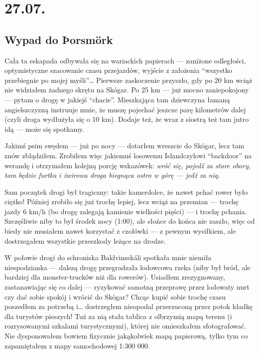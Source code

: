 \chapter*{27.07.}

\section*{Wypad do Þorsmörk}


Cała ta eskapada odbywała się na wariackich papierach --- zaniżone odległości, optymistyczne szacowanie czasu przejazdów, wyjście z założenia “wszystko przebiegnie po mojej myśli”… Pierwsze zaskoczenie przyszło, gdy po 20 km wciąż nie widziałem żadnego skrętu na Skógar. Po 25 km --- już mocno zaniepokojony --- pytam o drogę w jakiejś “chacie”. Mieszkająca tam dziewczyna łamaną angielszczyzną instruuje mnie, że muszę pojechać jeszcze parę kilometrów dalej (czyli droga wydłużyła się o 10 km). Dodaje też, że wraz z siostrą też tam jutro idą --- może się spotkamy.

Jakimś psim swędem --- już po nocy --- dotarłem wreszcie do Skógar, lecz tam znów zbłądziłem. Zrobiłem więc jakiemuś losowemu Islandczylowi “backdoor” na werandę i otrzymałem kolejną porcję wskazówek: \emph{wróć się, pojedź za stare obory, tam będzie furtka i żwirowa droga biegnąca ostro w górę --- jedź za nią}.

Sam początek drogi był tragiczny: takie kamerdolce, że nawet pchać rower było ciężko! Później zrobiło się już trochę lepiej, lecz wciąż na przemian --- trochę jazdy 6 km/h (bo drogę zalegają kamienie wielkości pięści) --- i trochę pchania. Szczęśliwie niby to był środek nocy (1:00), ale słońce do końca nie zaszło, więc od biedy nie musiałem nawet korzystać z czołówki --- z pewnym wysiłkiem, ale dostrzegałem wszystkie przeszkody leżące na drodze.

W połowie drogi do schroniska Baldvinsskáli spotkała mnie niemiła niespodzianka --- dalszą drogę przegradzała lodowcowa rzeka (niby był bród, ale bardziej dla monster-trucków niż dla rowerów). Usiadłem zrezygnowany, zastanawiając się co dalej --- ryzykować samotną przeprawę przez lodowaty nurt czy dać sobie spokój i wrócić do Skógar? Chcąc kupić sobie trochę czasu poszedłem za potrzebą i… dostrzegłem nieopodal przerzuconą przez potok kładkę dla turystów pieszych! Tuż za nią stała tablica z olbrzymią mapą terenu (i rozrysowanymi szkalami turystycznymi), której nie omieszkałem sfotografować. Nie dysponowałem bowiem fizycznie jakąkolwiek mapą papierową, tylko tym co zapamiętałem z mapy samochodowej 1:300 000.


